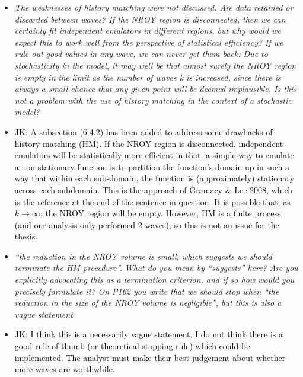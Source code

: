 \documentclass[12pt]{article}
\newcommand{\done}[2]{\item[#1]\textit{#2}}
\newcommand{\jack}[1]{\item{\textcolor{black}{JK: #1}}}
\begin{document}
\begin{itemize}
\done{P140}{The weaknesses of history matching were not discussed.  Are data retained or discarded between waves?  If the NROY region is disconnected, then we can certainly fit independent emulators in different regions, but why would we expect this to work well from the perspective of statistical efficiency?  If we rule out good values in any wave, we can never get them back:  Due to stochasticity in the model, it may well be that almost surely the NROY region is empty in the limit as the number of waves k is increased, since there is always a small chance that any given point will be deemed implausible.  Is this not a problem with the use of history matching in the context of a stochastic model?}

\jack{A subsection (6.4.2) has been added to address some drawbacks of history matching (HM). If the NROY region is disconnected, independent emulators will be statistically more efficient in that, a simple way to emulate a non-stationary function is to partition the function's domain up in such a way that within each sub-domain, the function is (approximately) stationary across each subdomain. This is the approach of Gramacy \& Lee 2008, which is the reference at the end of the sentence in question. It is possible that, as $k \to \infty$, the NROY region will be empty. However, HM is a finite process (and our analysis only performed 2 waves), so this is not an issue for the thesis.}

\done{P144}{ ``the reduction in the NROY volume is small, which suggests we should terminate the HM procedure''. What do you mean by ``suggests'' here?  Are you explicitly advocating this as a termination criterion, and if so how would you precisely formulate it?  On P162 you write that we should stop when ``the reduction in the size of the NROY volume is negligible'', but this is also a vague statement}

\jack{I think this is a necessarily vague statement.  I do not think there is a good rule of thumb (or theoretical stopping rule) which could be implemented. The analyst must make their best judgement about whether more waves are worthwhile.}


\end{itemize}
\end{document}
